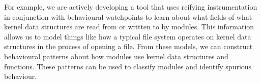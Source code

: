 \documentclass[letterpaper,twocolumn,10pt]{article}
\begin{document}

For example, we are actively developing a tool that uses reifying instrumentation in conjunction with behavioural watchpoints to learn about what fields of what kernel data structures are read from or written to by modules. This information allows us to model things like how a typical file system operates on kernel data structures in the process of opening a file. From these models, we can construct behavioural patterns about how modules use kernel data structures and functions. These patterns can be used to classify modules and identify spurious behaviour.

%
%
\end{document}
